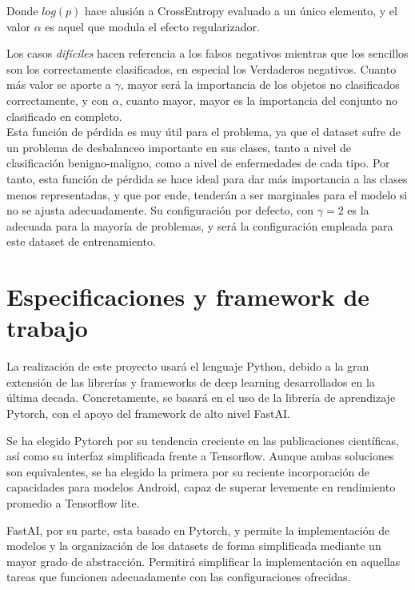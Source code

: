 Donde $log(p)$ hace alusión a CrossEntropy evaluado a un único elemento, y el valor $\alpha$ es aquel que modula el efecto regularizador.

Los casos \textit{difíciles} hacen referencia a los falsos negativos mientras que los sencillos son los correctamente clasificados, en especial los Verdaderos negativos. Cuanto más valor se aporte a $\gamma$, mayor será la importancia de los objetos no clasificados correctamente, y con $\alpha$, cuanto mayor, mayor es la importancia del conjunto no clasificado en completo.\\

Esta función de pérdida es muy útil para el problema, ya que el dataset sufre de un problema de desbalanceo importante en sus clases, tanto a nivel de clasificación benigno-maligno, como a nivel de enfermedades de cada tipo. Por tanto, esta función de pérdida se hace ideal para dar más importancia a las clases menos representadas, y que por ende, tenderán a ser marginales para el modelo si no se ajusta adecuadamente. Su configuración por defecto, con $\gamma = 2$ es la adecuada para la mayoría de problemas, y será la configuración empleada para este dataset de entrenamiento.

\section{Especificaciones y framework de trabajo}

La realización de este proyecto usará el lenguaje Python, debido a la gran extensión de las librerías y frameworks de deep learning desarrollados en la última decada. Concretamente, se basará en el uso de la librería de aprendizaje Pytorch\cite{paszke2019pytorch}, con el apoyo del framework de alto nivel FastAI\cite{howard2018fastai}.

Se ha elegido Pytorch por su tendencia creciente en las publicaciones científicas, así como su interfaz simplificada frente a Tensorflow. Aunque ambas soluciones son equivalentes, se ha elegido la primera por su reciente incorporación de capacidades para modelos Android, capaz de superar levemente en rendimiento promedio a Tensorflow lite.

FastAI, por su parte, esta basado en Pytorch, y permite la implementación de modelos y  la organización de los datasets de forma simplificada mediante un mayor grado de abstracción. Permitirá simplificar la implementación en aquellas tareas que funcionen adecuadamente con las configuraciones ofrecidas.\\


